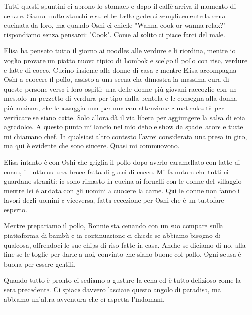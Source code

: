 Tutti questi spuntini ci aprono lo stomaco e dopo il caffè arriva il momento di cenare. Siamo molto stanchi e sarebbe bello goderci semplicemente la cena cucinata da loro, ma quando Oshi ci chiede "Wanna cook or wanna relax?" rispondiamo senza pensarci: "Cook". Come al solito ci piace farci del male.

Elisa ha pensato tutto il giorno ai noodles alle verdure e li riordina, mentre io voglio provare un piatto nuovo tipico di Lombok e scelgo il pollo con riso, verdure e latte di cocco. Cucino insieme alle donne di casa e mentre Elisa accompagna Oshi a cuocere il pollo, assisto a una scena che dimostra la massima cura di queste persone verso i loro ospiti: una delle donne più giovani raccoglie con un mestolo un pezzetto di verdura per tipo dalla pentola e le consegna alla donna più anziana, che le assaggia una per una con attenzione e meticolosità per verificare se siano cotte. Solo allora dà il via libera per aggiungere la salsa di soia agrodolce. A questo punto mi lancio nel mio debole show da spadellatore e tutte mi chiamano chef. In qualsiasi altro contesto l'avrei considerata una presa in giro, ma qui è evidente che sono sincere. Quasi mi commuovono.

Elisa intanto è con Oshi che griglia il pollo dopo averlo caramellato con latte di cocco, il tutto su una brace fatta di gusci di cocco. Mi fa notare che tutti ci guardano straniti: io sono rimasto in cucina ai fornelli con le donne del villaggio mentre lei è andata con gli uomini a cuocere la carne. Qui le donne non fanno i lavori degli uomini e viceversa, fatta eccezione per Oshi che è un tuttofare esperto.

Mentre prepariamo il pollo, Ronnie sta cenando con un suo compare sulla piattaforma di bambù e in continuazione ci chiede se abbiamo bisogno di qualcosa, offrendoci le sue chips di riso fatte in casa. Anche se diciamo di no, alla fine se le toglie per darle a noi, convinto che siano buone col pollo. Ogni scusa è buona per essere gentili.

Quando tutto è pronto ci sediamo a gustare la cena ed è tutto delizioso come la sera precedente. Ci spiace davvero lasciare questo angolo di paradiso, ma abbiamo un'altra avventura che ci aspetta l'indomani.

\begin{center}
    \noindent\rule{0.6\textwidth}{0.4pt}
\end{center}

